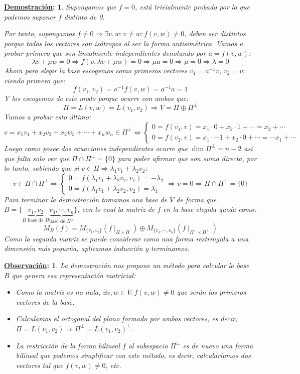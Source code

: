 \documentclass[10pt,a4paper,openright]{book}
\theoremstyle{break}
\newtheorem*{demo}{\underline{Demostración}:}
\newtheorem*{obs}{\underline{Observación}:}
\begin{document}
\begin{demo}
Supongamos que $f=0$, está trivialmente probado por lo que podemos suponer $f$ distinto de 0.

Por tanto, supongamos $f\neq 0\Rightarrow \exists v,w: v\neq w: f(v,w)\neq 0$, deben ser distintos porque todos los vectores son isótropos al ser la forma antisimétrica. Vamos a probar primero que son linealmente independientes denotando por $a=f(v,w)$:
$$\lambda v +\mu w = 0\Rightarrow f(v, \lambda v+\mu w)=0 \Rightarrow \mu a = 0\Rightarrow \mu = 0\Rightarrow \lambda =0$$
Ahora para elegir la base escogemos como primeros vectores $v_1 = a^{-1}v$, $v_2=w$ viendo primero que:
$$f(v_1,v_2)=a^{-1}f(v,w)= a^{-1}a = 1$$
Y los escogemos de este modo porque ocurre con ambos que:
$$\Pi = L(v,w)=L(v_1, v_2)\Rightarrow V = \Pi \oplus \Pi^\perp$$
Vamos a probar esto último:
$$v =x_1v_1+x_2v_2+ x_2w_3+\cdots + x_nw_n \in \Pi^\perp\Leftrightarrow\begin{cases}0 = f(v_1, v)= x_1\cdot 0 +x_2\cdot 1 + \cdots = x_2 +\cdots \\ 0 = f(v_2, v) = x_1\cdot -1 + x_2\cdot 0+ \cdots = -x_1+\cdots  \end{cases}$$
Luego como posee dos ecuaciones independientes ocurre que $\dim \Pi^\perp = n-2$ así que falta solo ver que $\Pi \cap \Pi^\perp = \{0\}$ para poder afirmar que son suma directa, por lo tanto, sabiendo que si $v\in \Pi\Rightarrow \lambda_1v_1+\lambda_2v_2$:
$$v\in \Pi\cap \Pi^\perp\Rightarrow \begin{cases}0 = f(\lambda_1v_1+\lambda_2v_2, v_1) = -\lambda_2 \\ 0 = f(\lambda_1v_1+\lambda_2v_2, v_2)=\lambda_1\end{cases}\Rightarrow v=0\Rightarrow \Pi\cap \Pi^\perp = \{0\}$$
Para terminar la demostración tomamos una base de $V$ de forma que $B=\{\underbrace{v_1,v_2}_{B\mbox{ base de }\Pi}\underbrace{v_3, \cdots , v_n}_{ \mbox{base de }\Pi^\perp}\}$, con lo cual la matriz de $f$ en la base elegida queda como:
$$M_B(f)=M_{\{v_1,v_2\}}(f\mid_{\Pi\times \Pi})\oplus M_{\{v_3, \cdots, v_n\}}(f\mid_{\Pi^\perp \times \Pi^\perp})$$
Como la segunda matriz se puede considerar como una forma restringida a una dimensión más pequeña, aplicamos inducción y terminamos.
\end{demo}

\begin{obs}
La demostración nos propone un método para calcular la base $B$ que genera esa representación matricial:
\begin{itemize}
\item Como la matriz es no nula, $\exists v,w\in V: f(v,w)\neq 0$ que serán los primeros vectores de la base.
\item Calculamos el ortogonal del plano formado por ambos vectores, es decir, $\Pi = L(v_1,v_2)\Rightarrow \Pi^\perp = L(v_1,v_2)^\perp$.
\item La restricción de la forma bilineal $f$ al subespacio $\Pi^\perp$ es de nuevo una forma bilineal que podemos simplificar con este método, es decir, calcularíamos dos vectores tal que $f(v,w)\neq 0$, etc.
\end{itemize}
\end{obs}
\end{document}
